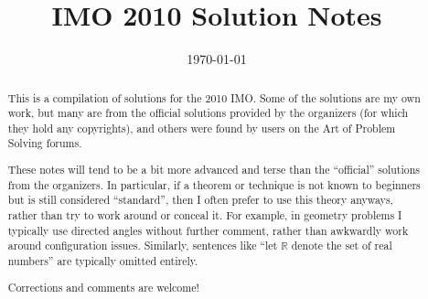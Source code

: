 \documentclass[11pt]{scrartcl}
\title{IMO 2010 Solution Notes}
\date{\today}
\begin{document}
\maketitle

\begin{abstract}
This is a compilation of solutions
for the 2010 IMO.
Some of the solutions are my own work,
but many are from the official solutions provided by the organizers
(for which they hold any copyrights),
and others were found by users on the Art of Problem Solving forums.

These notes will tend to be a bit more advanced and terse than the ``official''
solutions from the organizers.
In particular, if a theorem or technique is not known to beginners
but is still considered ``standard'', then I often prefer to
use this theory anyways, rather than try to work around or conceal it.
For example, in geometry problems I typically use directed angles
without further comment, rather than awkwardly work around configuration issues.
Similarly, sentences like ``let $\mathbb{R}$ denote the set of real numbers''
are typically omitted entirely.

Corrections and comments are welcome!
\end{abstract}

\tableofcontents
\newpage

\addtocounter{section}{-1}
\end{document}

